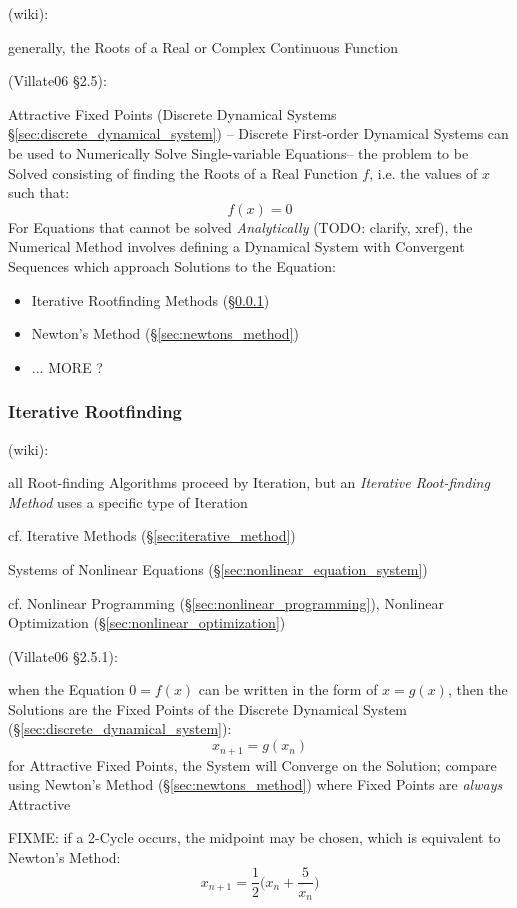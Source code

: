 (wiki):

generally, the Roots of a Real or Complex Continuous Function

(Villate06 \S 2.5):

Attractive Fixed Points (Discrete Dynamical Systems
\S\ref{sec:discrete_dynamical_system}) --
Discrete First-order Dynamical Systems can be used to Numerically Solve
Single-variable Equations-- the problem to be Solved consisting of finding the
Roots of a Real Function $f$, i.e. the values of $x$ such that:
\[
  f(x) = 0
\]
For Equations that cannot be solved \emph{Analytically} (TODO: clarify, xref),
the Numerical Method involves defining a Dynamical System with Convergent
Sequences which approach Solutions to the Equation:
\begin{itemize}
  \item Iterative Rootfinding Methods (\S\ref{sec:iterative_rootfinding})
  \item Newton's Method (\S\ref{sec:newtons_method})
  \item ... MORE ?
\end{itemize}



\subsubsection{Iterative Rootfinding}\label{sec:iterative_rootfinding}

(wiki):

all Root-finding Algorithms proceed by Iteration, but an \emph{Iterative
  Root-finding Method} uses a specific type of Iteration

\fist cf. Iterative Methods (\S\ref{sec:iterative_method})

\fist Systems of Nonlinear Equations
(\S\ref{sec:nonlinear_equation_system})

\fist cf. Nonlinear Programming (\S\ref{sec:nonlinear_programming}), Nonlinear
Optimization (\S\ref{sec:nonlinear_optimization})

(Villate06 \S 2.5.1):

when the Equation $0 = f(x)$ can be written in the form of $x = g(x)$, then the
Solutions are the Fixed Points of the Discrete Dynamical System
(\S\ref{sec:discrete_dynamical_system}):
\[
  x_{n+1} = g(x_n)
\]
for Attractive Fixed Points, the System will Converge on the Solution; compare
using Newton's Method (\S\ref{sec:newtons_method}) where Fixed Points are
\emph{always} Attractive

FIXME:
if a 2-Cycle occurs, the midpoint may be chosen, which is equivalent to Newton's
Method:
\[
  x_{n+1} = \frac{1}{2}\big(x_n + \frac{5}{x_n}\big)
\]



